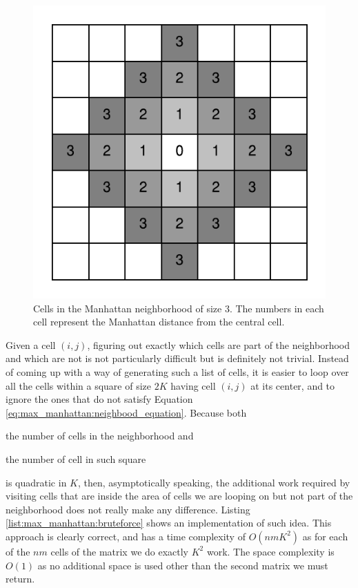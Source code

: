 \begin{figure}
	\centering
	\includegraphics[width=\textwidth]{sources/max_manhattan/images/neighborhood}
	\caption[Cells in the Manhattan neighborhood of size $3$.]{Cells in the Manhattan neighborhood
	of size $3$. The numbers in each cell represent the Manhattan distance from the central cell.}
	\label{fig:max_manhattan:neighborhood}
\end{figure}
Given a cell $(i,j)$, figuring out exactly which cells are part of the neighborhood and which are
not is not particularly difficult but is definitely not trivial. Instead of coming up with a way of
generating such a list of cells, it is easier to loop over all the cells within a square of size
$2K$ having cell $(i,j)$ at its center, and to ignore the ones that do not satisfy Equation
\ref{eq:max_manhattan:neighbood_equation}. Because both 
\begin{enumerate*}
	\item the number of cells in the neighborhood and 
	\item the number of cell in such square \end{enumerate*} is quadratic in $K$, then,
asymptotically speaking, the additional work required by visiting cells that are inside the area of
cells we are looping on but not part of the neighborhood does not really make any difference.
Listing \ref{list:max_manhattan:bruteforce} shows an implementation of such idea. This approach is
clearly correct, and has a time complexity of $O(nmK^2)$ as for each of the $nm$ cells of the matrix
we do exactly $K^2$ work. The space complexity is $O(1)$ as no additional space is used other than
the second matrix we must return.



